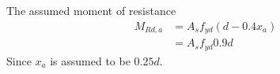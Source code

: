 The assumed moment of resistance
\begin{align*}
  M_{Rd,a} &= A_{s} f_{yd} (d - 0.4x_{a}) \\
  &= A_{s} f_{yd} 0.9 d
\end{align*}
Since $x_{a} $ is assumed to be $0.25 d$.